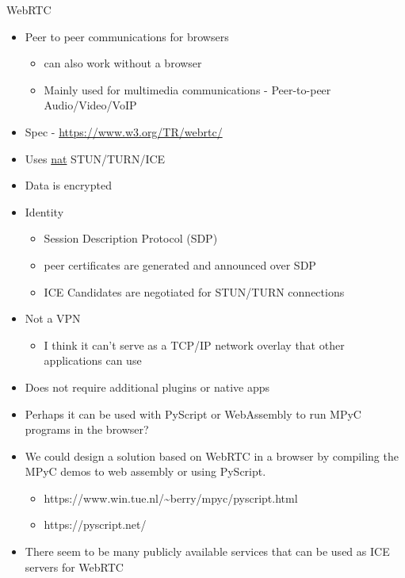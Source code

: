 \hypertarget{notes__02170-webrtc.md}{}
\begin{block}{WebRTC}
\protect\hypertarget{notes__02170-webrtc.md__webrtc}{}
\begin{itemize}
\tightlist
\item
  Peer to peer communications for browsers

  \begin{itemize}
  \tightlist
  \item
    can also work without a browser
  \item
    Mainly used for multimedia communications - Peer-to-peer
    Audio/Video/VoIP
  \end{itemize}
\item
  Spec -
  \href{https://www.w3.org/TR/webrtc/\#persistent-information-exposed-by-webrtc}{https://www.w3.org/TR/webrtc/}
\item
  Uses \protect\hyperlink{notes__02021-internet-protocol.md}{nat}
  STUN/TURN/ICE
\item
  Data is encrypted
\item
  Identity

  \begin{itemize}
  \tightlist
  \item
    Session Description Protocol (SDP)
  \item
    peer certificates are generated and announced over SDP
  \item
    ICE Candidates are negotiated for STUN/TURN connections
  \end{itemize}
\item
  Not a VPN

  \begin{itemize}
  \tightlist
  \item
    I think it can't serve as a TCP/IP network overlay that other
    applications can use
  \end{itemize}
\item
  Does not require additional plugins or native apps
\item
  Perhaps it can be used with PyScript or WebAssembly to run MPyC
  programs in the browser?
\item
  We could design a solution based on WebRTC in a browser by compiling
  the MPyC demos to web assembly or using PyScript.

  \begin{itemize}
  \tightlist
  \item
    https://www.win.tue.nl/\textasciitilde berry/mpyc/pyscript.html
  \item
    https://pyscript.net/
  \end{itemize}
\item
  There seem to be many publicly available services that can be used as
  ICE servers for WebRTC


\end{itemize}
\end{block}
